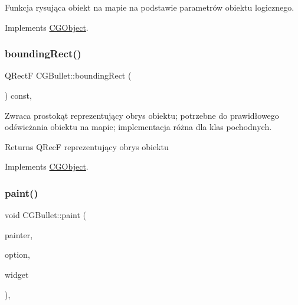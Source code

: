 Funkcja rysująca obiekt na mapie na podstawie parametrów obiektu logicznego. 



Implements \mbox{\hyperlink{class_c_g_object_a859e765fbb3ab0d6ad73ca58e5e49779}{C\+G\+Object}}.

\mbox{\label{class_c_g_bullet_a7be9c986a5c21d0a27dd5d64b209a82d}} 
\subsubsection{\texorpdfstring{bounding\+Rect()}{boundingRect()}}
{\footnotesize\ttfamily Q\+RectF C\+G\+Bullet\+::bounding\+Rect (\begin{DoxyParamCaption}{ }\end{DoxyParamCaption}) const\hspace{0.3cm}{\ttfamily [override]}, {\ttfamily [virtual]}}



Zwraca prostokąt reprezentujący obrys obiektu; potrzebne do prawidłowego odświeżania obiektu na mapie; implementacja różna dla klas pochodnych. 

\begin{DoxyReturn}{Returns}
Q\+RecF reprezentujący obrys obiektu 
\end{DoxyReturn}


Implements \mbox{\hyperlink{class_c_g_object_ab9edf3d10a53c254cdb5d3d8de930207}{C\+G\+Object}}.

\mbox{\label{class_c_g_bullet_ad64e0666c42b0d65bb90ad37998252d0}} 
\subsubsection{\texorpdfstring{paint()}{paint()}}
{\footnotesize\ttfamily void C\+G\+Bullet\+::paint (\begin{DoxyParamCaption}\item[{Q\+Painter $\ast$}]{painter,  }\item[{const Q\+Style\+Option\+Graphics\+Item $\ast$}]{option,  }\item[{Q\+Widget $\ast$}]{widget }\end{DoxyParamCaption})\hspace{0.3cm}{\ttfamily [override]}, {\ttfamily [virtual]}}



